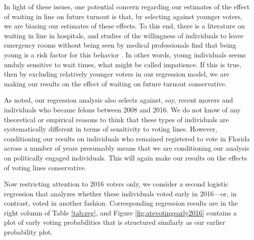 \documentclass[12pt,titlepage]{article}
\begin{document}
In light of these issues, one potential concern regarding our
estimates of the effect of waiting in line on future turnout is that,
by selecting against younger voters, we are biasing our estimates of
these effects. To this end, there is a literature on waiting in line
in hospitals, and studies of the willingness of individuals to leave
emergency rooms without being seen by medical professionals find that
being young is a risk factor for this behavior
\citep{sunetal:lwbs,clareycooke:emergencyroomleave,shaikh:howlongwaiter}.
In other words, young individuals seems unduly sensitive to wait
times, what might be called impatience.  If this is true, then by
excluding relatively younger voters in our regression model, we are
making our results on the effect of waiting on future turnout
conservative.

As noted, our regression analysis also selects against, say, recent
movers and individuals who became felons between 2008 and 2016.  We do
not know of any theoretical or empirical reasons to think that these
types of individuals are systematically different in terms of
sensitivity to voting lines.  However, conditioning our results on
individuals who remained registered to vote in Florida across a number
of years presumably means that we are conditioning our analysis on
politically engaged individuals.  This will again make our results on
the effects of voting lines conservative.




Now restricting attention to 2016 voters only, we consider a second
logistic regression that analyzes whether these individuals voted
early in 2016---or, in contrast, voted in another fashion.
Corresponding regression results are in the right column of Table
\ref{tab:reg}, and Figure \ref{fig:atevotingearly2016} contains a plot
of early voting probabilities that is structured similarly as our
earlier probability plot.
\end{document}
